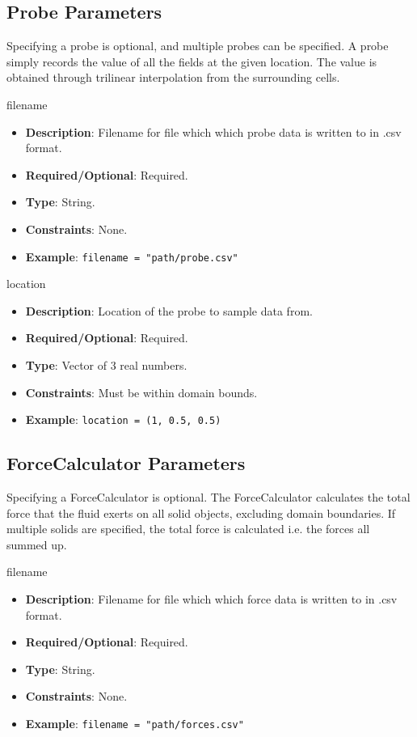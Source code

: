 \subsection*{Probe Parameters}
Specifying a probe is optional, and multiple probes can be specified. A probe simply records the value of all the fields at the given location. The value is obtained through trilinear interpolation from the surrounding cells.

filename
\vspace{\the\parameterListSpacing}
\begin{itemize}
    \item {\bf Description}: Filename for file which which probe data is written to in .csv format.
    \item {\bf Required/Optional}: Required.
    \item {\bf Type}: String.
    \item {\bf Constraints}: None.
    \item {\bf Example}: \lstinline!filename = "path/probe.csv"!
\end{itemize}

location
\vspace{\the\parameterListSpacing}
\begin{itemize}
    \item {\bf Description}: Location of the probe to sample data from.
    \item {\bf Required/Optional}: Required.
    \item {\bf Type}: Vector of 3 real numbers.
    \item {\bf Constraints}: Must be within domain bounds.
    \item {\bf Example}: \lstinline!location = (1, 0.5, 0.5)!
\end{itemize}



\subsection*{ForceCalculator Parameters}
Specifying a ForceCalculator is optional. The ForceCalculator calculates the total force that the fluid exerts on all solid objects, excluding domain boundaries. If multiple solids are specified, the total force is calculated i.e. the forces all summed up.

filename
\vspace{\the\parameterListSpacing}
\begin{itemize}
    \item {\bf Description}: Filename for file which which force data is written to in .csv format.
    \item {\bf Required/Optional}: Required.
    \item {\bf Type}: String.
    \item {\bf Constraints}: None.
    \item {\bf Example}: \lstinline!filename = "path/forces.csv"!
\end{itemize}



